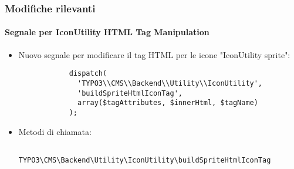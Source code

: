 \begin{frame}[fragile]
	\frametitle{Modifiche rilevanti}
	\framesubtitle{Segnale per IconUtility HTML Tag Manipulation}

	\lstset{
		basicstyle=\tiny\ttfamily
	}

	\begin{itemize}

		\item Nuovo segnale per modificare il tag HTML per le icone "IconUtility sprite":

		\begin{lstlisting}
			dispatch(
			  'TYPO3\\CMS\\Backend\\Utility\\IconUtility',
			  'buildSpriteHtmlIconTag',
			  array($tagAttributes, $innerHtml, $tagName)
			);
		\end{lstlisting}

		\item Metodi di chiamata:

		\begin{lstlisting}
			TYPO3\CMS\Backend\Utility\IconUtility\buildSpriteHtmlIconTag
		\end{lstlisting}

	\end{itemize}

\end{frame}


